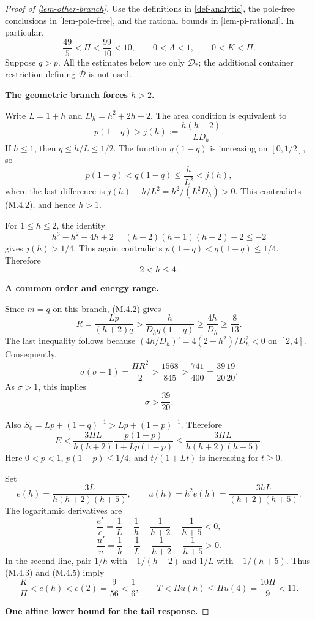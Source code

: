 \documentclass[11pt,a4paper]{article}
\theoremstyle{proofmanuscript}
\begin{document}
\begin{proof}[Proof of \ref{lem-other-branch}]

Use the definitions in \ref{def-analytic}, the pole-free conclusions in \ref{lem-pole-free}, and the rational bounds in \ref{lem-pi-rational}. In particular, \[
\frac{49}{5}<\Pi<\frac{99}{10}<10,
\qquad 0<A<1,\qquad 0<K<\Pi.
\] Suppose \(q>p\). All the estimates below use only \(\mathcal D_*\); the additional container restriction defining \(\mathcal D\) is not used.

\textbf{The geometric branch forces \(h>2\).}

Write \(L=1+h\) and \(D_h=h^2+2h+2\). The area condition is equivalent to \[
p(1-q)>j(h):=\frac{h(h+2)}{LD_h}.
\tag{M.4.2}
\] If \(h\le1\), then \(q\le h/L\le1/2\). The function \(q(1-q)\) is increasing on \([0,1/2]\), so \[
p(1-q)<q(1-q)\le\frac{h}{L^2}<j(h),
\] where the last difference is \(j(h)-h/L^2=h^2/(L^2D_h)>0\). This contradicts (M.4.2), and hence \(h>1\).

For \(1\le h\le2\), the identity \[
h^3-h^2-4h+2=(h-2)(h-1)(h+2)-2\le-2
\] gives \(j(h)>1/4\). This again contradicts \(p(1-q)<q(1-q)\le1/4\). Therefore \[
2<h\le4.
\tag{M.4.3}
\]

\textbf{A common order and energy range.}

Since \(m=q\) on this branch, (M.4.2) gives \[
R=\frac{Lp}{(h+2)q}
>\frac{h}{D_hq(1-q)}
\ge\frac{4h}{D_h}\ge\frac8{13}.
\] The last inequality follows because \((4h/D_h)'=4(2-h^2)/D_h^2<0\) on \([2,4]\). Consequently, \[
\sigma(\sigma-1)=\frac{\Pi R^2}{2}
>\frac{1568}{845}
>\frac{741}{400}
=\frac{39}{20}\frac{19}{20}.
\] As \(\sigma>1\), this implies \[
\sigma>\frac{39}{20}.
\tag{M.4.4}
\]

Also \(S_0=Lp+(1-q)^{-1}>Lp+(1-p)^{-1}\). Therefore \[
E<\frac{3\Pi L}{h(h+2)}
\frac{p(1-p)}{1+Lp(1-p)}
\le\frac{3\Pi L}{h(h+2)(h+5)}.
\tag{M.4.5}
\] Here \(0<p<1\), \(p(1-p)\le1/4\), and \(t/(1+Lt)\) is increasing for \(t\ge0\).

Set \[
e(h)=\frac{3L}{h(h+2)(h+5)},\qquad
u(h)=h^2e(h)=\frac{3hL}{(h+2)(h+5)}.
\] The logarithmic derivatives are \[
\frac{e'}e=\frac1L-\frac1h-\frac1{h+2}-\frac1{h+5}<0,
\] \[
\frac{u'}u=\frac1h+\frac1L-\frac1{h+2}-\frac1{h+5}>0.
\] In the second line, pair \(1/h\) with \(-1/(h+2)\) and \(1/L\) with \(-1/(h+5)\). Thus (M.4.3) and (M.4.5) imply \[
\frac K\Pi<e(h)<e(2)=\frac9{56}<\frac16,
\qquad
T<\Pi u(h)\le\Pi u(4)=\frac{10\Pi}{9}<11.
\tag{M.4.6}
\]

\textbf{One affine lower bound for the tail response.}


\end{proof}
\end{document}
